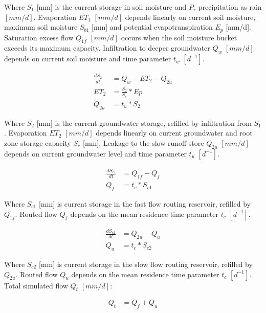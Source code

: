 {} %

Where $S_1$ [mm] is the current storage in soil moisture and $P_r$ precipitation as rain $[mm/d]$. Evaporation $ET_1$ $[mm/d]$ depends linearly on current soil moisture, maximum soil moisture $S_{b1}$ [mm] and potential evapotranspiration $E_p$ [mm/d]. Saturation excess flow $Q_{1f}$  $[mm/d]$ occurs when the soil moisture bucket exceeds its maximum capacity. Infiltration to deeper groundwater $Q_w$  $[mm/d]$ depends on current soil moisture and time parameter $t_w$  $[d^{-1}]$.

\begin{align}
	\frac{dS_2}{dt} &= Q_w-ET_2-Q_{2u}\\
	ET_2 &= \frac{S_2}{S_{e}}*Ep\\
	Q_{2u} &= t_u*S_2
\end{align}

Where $S_2$ [mm] is the current groundwater storage, refilled by infiltration from $S_1$. Evaporation $ET_2$ $[mm/d]$ depends linearly on current groundwater and root zone storage capacity $S_e$ [mm]. Leakage to the slow runoff store $Q_{2u}$ $[mm/d]$ depends on current groundwater level and time parameter $t_u$ $[d^{-1}]$. 

\begin{align}
	\frac{dS_{c1}}{dt} &= Q_{1f}-Q_{f}\\
	Q_f &= t_c*S_{c1}
\end{align}

Where $S_{c1}$ [mm] is current storage in the fast flow routing reservoir, refilled by $Q_{1f}$. Routed flow $Q_f$ depends on the mean residence time parameter $t_c$ $[d^{-1}]$.

\begin{align}
	\frac{dS_{c2}}{dt} &= Q_{2u}-Q_{u}\\
	Q_u &= t_c*S_{c2}
\end{align}

Where $S_{c2}$ [mm] is current storage in the slow flow routing reservoir, refilled by $Q_{2u}$. Routed flow $Q_u$ depends on the mean residence time parameter $t_c$ $[d^{-1}]$. Total simulated flow $Q_t$ $[mm/d]$:

\begin{align}
	Q_t &= Q_f + Q_u
\end{align}


